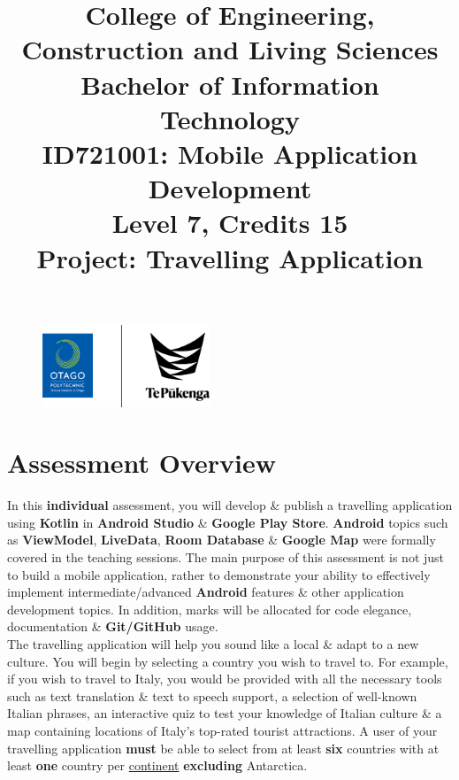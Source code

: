 \documentclass{article}
\author{}
\begin{document}
\begin{figure}
	\centering
	\includegraphics[width=50mm]{../../resources/img/logo.png}
\end{figure}

\title{College of Engineering, Construction and Living Sciences\\Bachelor of Information Technology\\ID721001: Mobile Application Development\\Level 7, Credits 15\\\textbf{Project: Travelling Application}}
\date{}
\maketitle

\section*{Assessment Overview}
In this \textbf{individual} assessment, you will develop \& publish a travelling application using \textbf{Kotlin} in \textbf{Android Studio} \& \textbf{Google Play Store}. \textbf{Android} topics such as \textbf{ViewModel}, \textbf{LiveData}, \textbf{Room Database} \& \textbf{Google Map} were formally covered in the teaching sessions. The main purpose of this assessment is not just to build a mobile application, rather to demonstrate your ability to effectively implement intermediate/advanced \textbf{Android} features \& other application development topics. In addition, marks will be allocated for code elegance, documentation \& \textbf{Git/GitHub} usage. \\

The travelling application will help you sound like a local \& adapt to a new culture. You will begin by selecting a country you wish to travel to. For example, if you wish to travel to Italy, you would be provided with all the necessary tools such as text translation \& text to speech support, a selection of well-known Italian phrases, an interactive quiz to test your knowledge of Italian culture \& a map containing locations of Italy's top-rated tourist attractions. A user of your travelling application \textbf{must} be able to select from at least \textbf{six} countries with at least \textbf{one} country per \href{https://www.worldometers.info/geography/7-continents/}{continent} \textbf{excluding} Antarctica.
\end{document}
